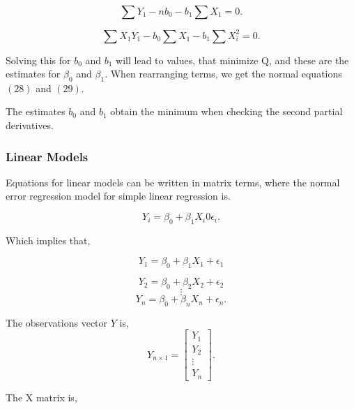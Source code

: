 \begin{equation}
	\sum Y_1 - n b_0 - b_1 \sum X_1 =0 .
\end{equation}

\begin{equation}
	\sum X_1 Y_1  - b_0 \sum X_1 - b_1 \sum X_i^2 =0 .
\end{equation}

\noindent Solving this for $b_0$ and $b_1$ will lead to values, that minimize Q, and these are the estimates for $\beta_0$ and $\beta_1$. 
When rearranging terms, we get the normal equations $(28)$ and $(29)$.

\noindent The estimates $b_0$ and $b_1$ obtain the minimum when checking the second partial derivatives. \newline


\subsubsection{Linear Models}

Equations for linear models can be written in matrix terms, where the normal error regression model for simple linear regression is.
 

\begin{equation}
Y_i = \beta_0 + \beta_1 X_i 0 \epsilon_i .
\end{equation}


\noindent Which implies that,

\begin{equation}
Y_1 = \beta_0 + \beta_1 X_1 + \epsilon_1
\end{equation}

\begin{equation}
Y_2 = \beta_0 + \beta_2 X_2 + \epsilon_2
\end{equation}
$$\vdots$$
\begin{equation}
Y_n = \beta_0 + \beta_n X_n + \epsilon_n .
\end{equation}

\noindent The observations vector $Y$ is,
\begin{equation} Y_{n \times 1} =
\left[
\begin{array}{c}
	Y_1 \\ 
	Y_2 \\ 
	\vdots \\
	Y_n 
\end{array}
\right].
\end{equation}

\noindent The X matrix is, 

